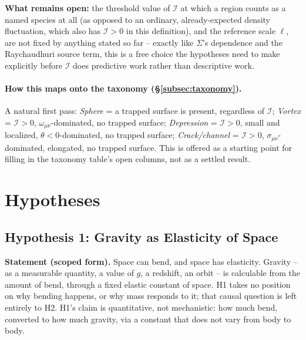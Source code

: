 \documentclass[12pt, a4paper]{article}
\begin{document}
\textbf{What remains open:} the threshold value of $\mathcal{I}$ at
which a region counts as a named species at all (as opposed to an
ordinary, already-expected density fluctuation, which also has
$\mathcal{I}>0$ in this definition), and the reference scale $\ell$,
are not fixed by anything stated so far -- exactly like $\Sigma$'s
dependence and the Raychaudhuri source term, this is a free choice
the hypotheses need to make explicitly before $\mathcal{I}$ does
predictive work rather than descriptive work.

\paragraph{How this maps onto the taxonomy (\S\ref{subsec:taxonomy}).}
A natural first pass: \emph{Sphere} = a trapped surface is present,
regardless of $\mathcal{I}$; \emph{Vortex} = $\mathcal{I}>0$,
$\omega_{\mu\nu}$-dominated, no trapped surface; \emph{Depression} =
$\mathcal{I}>0$, small and localized, $\theta<0$-dominated, no
trapped surface; \emph{Crack/channel} = $\mathcal{I}>0$,
$\sigma_{\mu\nu}$-dominated, elongated, no trapped surface. This is
offered as a starting point for filling in the taxonomy table's open
columns, not as a settled result.

\section{Hypotheses}
\label{sec:hypotheses}

\subsection{Hypothesis 1: Gravity as Elasticity of Space}
\label{subsec:h1}
\textbf{Statement (scoped form).} Space can bend, and space has
elasticity. Gravity -- as a measurable quantity, a value of $g$, a
redshift, an orbit -- is calculable from the amount of bend, through
a fixed elastic constant of space. H1 takes no position on why
bending happens, or why mass responds to it; that causal question is
left entirely to H2. H1's claim is quantitative, not mechanistic: how
much bend, converted to how much gravity, via a constant that does
not vary from body to body.
\end{document}
